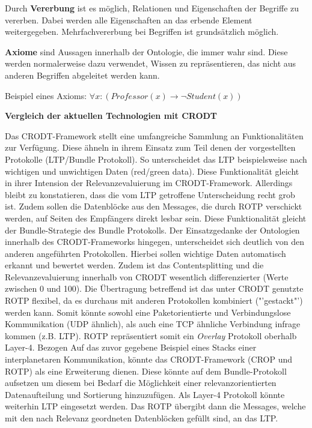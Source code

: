    Durch \textbf{Vererbung} ist es m{\"o}glich, Relationen und Eigenschaften der
   Begriffe zu vererben. Dabei werden alle Eigenschaften an das erbende Element
   weitergegeben. Mehrfachvererbung bei Begriffen ist grunds{\"a}tzlich
   m{\"o}glich.
   
   \textbf{Axiome} sind Aussagen innerhalb der Ontologie, die immer wahr sind.
   Diese werden normalerweise dazu verwendet, Wissen zu repr{\"a}sentieren, das
   nicht aus anderen Begriffen abgeleitet werden kann.
   
   Beispiel eines Axioms:\newline
   $\forall x : (Professor(x) \rightarrow \neg Student(x))$   
      
\textbf{Vergleich der aktuellen Technologien mit CRODT}

Das CRODT-Framework stellt eine umfangreiche Sammlung an Funktionalit{\"a}ten
zur Verf{\"u}gung. Diese {\"a}hneln in ihrem Einsatz zum Teil denen der
vorgestellten Protokolle (LTP/Bundle Protokoll). So unterscheidet das LTP
beispielsweise nach wichtigen und unwichtigen Daten (red/green data). Diese
Funktionalit{\"a}t gleicht in ihrer Intension der Relevanzevaluierung im
CRODT-Framework. Allerdings bleibt zu konstatieren, dass die vom LTP getroffene
Unterscheidung recht grob ist. Zudem sollen die
Datenbl{\"o}cke aus den Messages, die durch ROTP verschickt werden, auf Seiten
des Empf{\"a}ngers direkt lesbar sein. Diese Funktionalit{\"a}t gleicht der
Bundle-Strategie des Bundle Protokolls. Der Einsatzgedanke der Ontologien
innerhalb des CRODT-Frameworks hingegen, unterscheidet sich deutlich von den
anderen angef{\"u}hrten Protokollen. Hierbei sollen wichtige Daten automatisch
erkannt und bewertet werden. Zudem ist das Contentsplitting und die
Relevanzevaluierung innerhalb von CRODT wesentlich differenzierter (Werte
zwischen 0 und 100). Die {\"U}bertragung betreffend ist das unter \gls{CRODT}
genutzte \gls{ROTP} flexibel, da es durchaus mit anderen Protokollen kombiniert
("'gestackt"') werden kann. Somit k{\"o}nnte sowohl eine Paketorientierte und
Verbindungslose Kommunikation (UDP {\"a}hnlich), als auch eine TCP {\"a}hnliche
Verbindung infrage kommen (z.B. LTP). ROTP repr{\"a}sentiert somit ein
\textit{Overlay} Protokoll oberhalb Layer-4. Bezogen Auf das zuvor gegebene
Beispiel eines Stacks einer interplanetaren Kommunikation, k{\"o}nnte das
CRODT-Framework (CROP und ROTP) als eine Erweiterung dienen. Diese
k{\"o}nnte auf dem Bundle-Protokoll aufsetzen um diesem bei Bedarf die
M{\"o}glichkeit einer relevanzorientierten Datenaufteilung und Sortierung
hinzuzuf{\"u}gen. Als Layer-4 Protokoll k{\"o}nnte weiterhin LTP eingesetzt
werden. Das ROTP {\"u}bergibt dann die Messages, welche mit den nach Relevanz
geordneten Datenbl{\"o}cken gef{\"u}llt sind, an das LTP.

